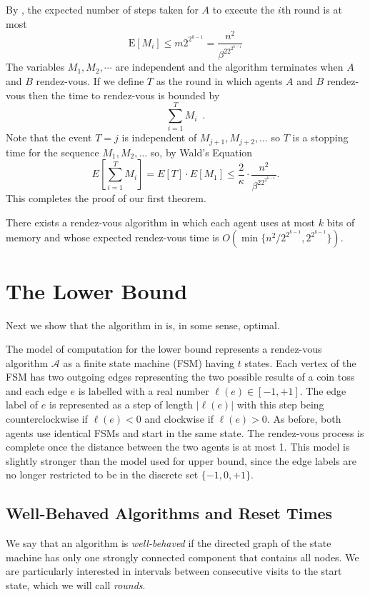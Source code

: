 \documentclass[lotsofwhite]{patmorin}
\newcommand{\E}{\mathrm{E}}
\newcommand{\A}{\mathcal{A}}
\begin{document}
By , the expected number of steps taken for $A$ to
execute the $i$th round is at most
\[
    \E[M_i] \le m 2^{2^{k-1}} = \frac{n^2}{\beta^22^{2^{k-1}}}
\]
The variables $M_1,M_2,\cdots$ are independent and the algorithm
terminates when $A$ and $B$ rendez-vous.  If we define $T$ as
the round in which agents $A$ and $B$ rendez-vous then the time to
rendez-vous is bounded by
\[
   \sum_{i=1}^T M_i \enspace .
\]
Note that the event $T=j$ is independent of $M_{j+1},M_{j+2},\ldots$
so $T$ is a stopping time for the sequence
$M_1,M_2,\ldots$ so, by Wald's Equation
\[
   E\left[\sum_{i=1}^T M_i\right] = E[T]\cdot E[M_1] \le
\frac{2}{\kappa}\cdot \frac{n^2}{\beta^22^{2^{k-1}}}.
\]
This completes the proof of our first theorem.
\begin{thm}
There exists a rendez-vous algorithm in which each agent uses at most
$k$ bits of memory and whose expected rendez-vous time is
$O(\min\{n^2/2^{2^{k-1}},2^{2^{k-1}}\})$.
\end{thm}

\section{The Lower Bound}

Next we show that the algorithm in  is, in some
sense, optimal.

The model of computation for the lower bound represents a rendez-vous
algorithm $\A$ as a finite state machine (FSM) having $t$ states. Each
vertex of the FSM has two outgoing edges representing the two possible
results of a coin toss and each edge $e$ is labelled with a real
number $\ell(e)\in[-1,+1]$.  The edge label of $e$ is represented as a
step of length $|\ell(e)|$ with this step being counterclockwise if
$\ell(e)<0$ and clockwise if $\ell(e)>0$.  As before, both agents use
identical FSMs and start in the same state.  The rendez-vous process
is complete once the distance between the two agents is at most 1.
This model is slightly stronger than the model used for upper bound,
since the edge labels are no longer restricted to be in the discrete
set $\{-1,0,+1\}$.

\subsection{Well-Behaved Algorithms and Reset Times}

We say that an algorithm is \emph{well-behaved} if the directed graph
of the state machine has only one strongly connected component that
contains all nodes.  We are particularly interested in intervals
between consecutive visits to the start state, which we will call
\emph{rounds}.
\end{document}
